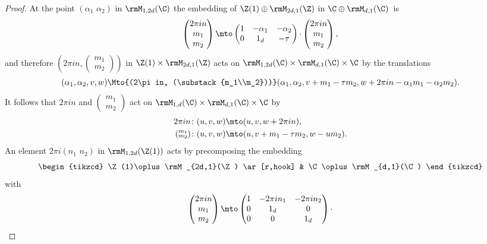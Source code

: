 \begin{proof}
At the point $(\alpha_1\,\,\alpha_2)$ in
$\rmM_{1,2d}(\C)$ the embedding of $\Z(1)\oplus\rmM_{2d,1}(\Z)$ in
$\C\oplus \rmM_{d,1}(\C)$~is
\[
\begin{pmatrix}
2\pi in\\ m_1\\ m_2
\end{pmatrix}
\mto
\begin{pmatrix}
1 & -\alpha_1 & -\alpha_2\\0 & 1_d & -\tau
\end{pmatrix}{\cdot}
\begin{pmatrix}
2\pi in\\ m_1\\ m_2
\end{pmatrix},
\]
and therefore $(2\pi in, (\substack{m_1\\m_2}))$ in
$\Z(1)\times\rmM_{2d,1}(\Z)$ acts on $\rmM_{1,2d}(\C)\times
\rmM_{d,1}(\C)\times\C$ by the translations
\[
(\alpha_1,\alpha_2,v,w) \Mto{(2\pi in, (\substack{m_1\\m_2}))}
(\alpha_1,\alpha_2,v+m_1-\tau m_2,w+2\pi in-\alpha_1m_1-\alpha_2m_2).
\]
It follows that $2\pi i n$ and $(\substack{m_1\\m_2})$ act on
$\rmM_{1,d}(\C)\times\rmM_{d,1}(\C)\times\C$ by
\begin{equation}
\label{eq:action_m}
\begin{aligned}
2\pi i n\colon (u,v,w) & \mto (u,v,w+2\pi i n),\\
(\substack{m_1\\m_2})\colon (u,v,w) & \mto (u,v+m_1-\tau m_2,w-um_2).
\end{aligned}
\end{equation}
An element $2\pi i(n_1\,\, n_2)$ in $\rmM_{1,2d}(\Z(1))$ acts by precomposing
the embedding
\[
\begin{tikzcd}
\Z(1)\oplus\rmM_{2d,1}(\Z) \ar[r,hook] & \C\oplus \rmM_{d,1}(\C)
\end{tikzcd}
\]
with
\[
\begin{pmatrix}
2\pi in \\ m_1\\ m_2
\end{pmatrix}
 \mto
\begin{pmatrix}
1 & -2\pi in_1 & -2\pi i n_2\\
0 & 1_d & 0 \\
0 & 0 & 1_d
\end{pmatrix} {\cdot}
\]
\end{proof}
